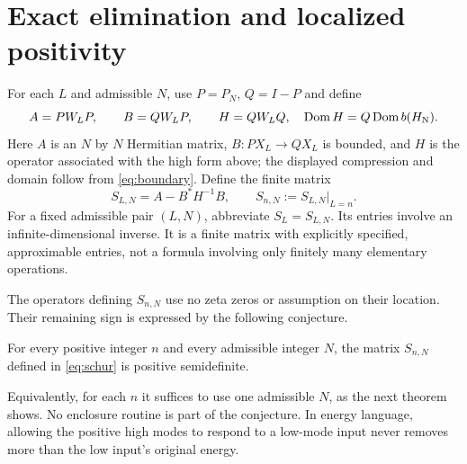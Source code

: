 \section{Exact elimination and localized positivity}
For each $L$ and admissible $N$, use $P=P_N$, $Q=I-P$ and define
\[
A=PW_LP,\qquad B=QW_LP,\qquad
H=QW_LQ,\quad \operatorname{Dom} H=Q\operatorname{Dom} b(H_{\rm N}).
\]
Here $A$ is an $N$ by $N$ Hermitian matrix, $B:PX_L\to QX_L$ is
bounded, and $H$ is the operator associated with the high form above;
the displayed compression and domain follow from \eqref{eq:boundary}. Define the finite matrix
\begin{equation}\label{eq:schur}
S_{L,N}=A-B^*H^{-1}B,\qquad S_{n,N}:=S_{L,N}\big|_{L=n}.
\end{equation}
For a fixed admissible pair $(L,N)$, abbreviate $S_L=S_{L,N}$.
Its entries involve an infinite-dimensional inverse. It is a finite matrix
with explicitly specified, approximable entries, not a formula involving
only finitely many elementary operations.

The operators defining $S_{n,N}$ use no zeta zeros or assumption on their
location. Their remaining sign is expressed by the following conjecture.
\begin{conjecture}\label{conj:main}
For every positive integer $n$ and every admissible integer $N$, the matrix
$S_{n,N}$ defined in \eqref{eq:schur} is positive semidefinite.
\end{conjecture}
Equivalently, for each $n$ it suffices to use one admissible $N$, as the
next theorem shows. No enclosure routine is part of the conjecture.
In energy language, allowing the positive high modes to respond to a low-mode
input never removes more than the low input's original energy.

